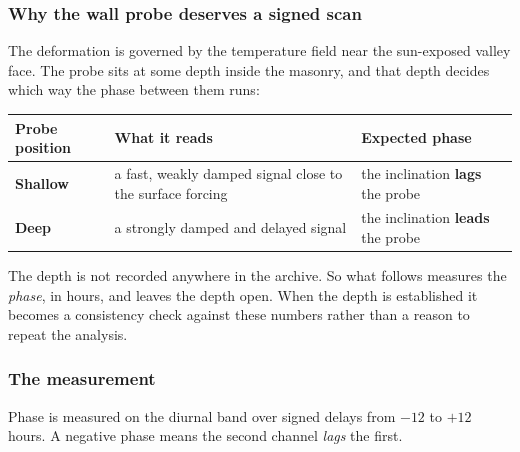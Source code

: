 \documentclass[11pt,a4paper]{article}
\begin{document}
\subsubsection*{Why the wall probe deserves a signed scan}

The deformation is governed by the temperature field near the sun-exposed valley
face. The probe sits at some depth inside the masonry, and that depth decides
which way the phase between them runs:

\begin{center}
\small
\begin{tabularx}{\textwidth}{L{2.6cm}L{6.4cm}Y}
\toprule
\textbf{Probe position} & \textbf{What it reads} & \textbf{Expected phase} \\
\midrule
\textbf{Shallow} & a fast, weakly damped signal close to the surface forcing &
the inclination \textbf{lags} the probe \\
\textbf{Deep} & a strongly damped and delayed signal &
the inclination \textbf{leads} the probe \\
\bottomrule
\end{tabularx}
\end{center}

The depth is not recorded anywhere in the archive. So what follows measures the
\emph{phase}, in hours, and leaves the depth open. When the depth is established
it becomes a consistency check against these numbers rather than a reason to
repeat the analysis.

\subsubsection*{The measurement}

Phase is measured on the diurnal band over signed delays from $-12$ to $+12$
hours. A negative phase means the second channel \emph{lags} the first.
\end{document}
